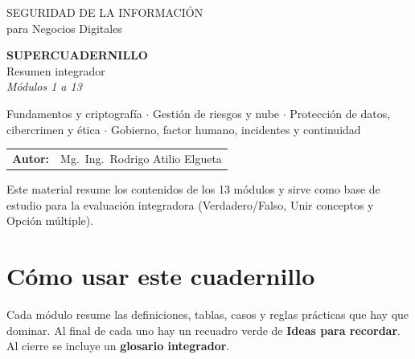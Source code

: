 \documentclass[12pt,a4paper]{article}
\begin{document}
\begin{titlepage}
\centering
\vspace*{1.5cm}
\begin{cajaTitulo}[width=\textwidth, halign=center]
  SEGURIDAD DE LA INFORMACI\'ON\\[4pt]
  {\large para Negocios Digitales}
\end{cajaTitulo}

\vspace{1.8cm}
{\Huge\bfseries\color{azulPrincipal} SUPERCUADERNILLO}\\[10pt]
{\LARGE\color{dorado} Resumen integrador}\\[12pt]
{\Large\itshape M\'odulos 1 a 13}\\[1.5cm]

\begin{minipage}{0.85\textwidth}\centering\large
Fundamentos y criptograf\'ia $\cdot$ Gesti\'on de riesgos y nube $\cdot$
Protecci\'on de datos, cibercrimen y \'etica $\cdot$
Gobierno, factor humano, incidentes y continuidad
\end{minipage}

\vfill
\begin{tabular}{rl}
\textbf{Autor:} & Mg.\ Ing.\ Rodrigo Atilio Elgueta \\
\end{tabular}

\vspace{1cm}
\begin{tcolorbox}[colback=grisClaro, colframe=azulPrincipal, arc=3mm, width=0.9\textwidth]
\centering\small
Este material resume los contenidos de los 13 m\'odulos y sirve como base de
estudio para la evaluaci\'on integradora (Verdadero/Falso, Unir conceptos y
Opci\'on m\'ultiple).
\end{tcolorbox}
\end{titlepage}

\tableofcontents
\newpage

\section*{C\'omo usar este cuadernillo}

Cada m\'odulo resume las definiciones, tablas, casos y reglas pr\'acticas que
hay que dominar. Al final de cada uno hay un recuadro verde de
\textbf{Ideas para recordar}. Al cierre se incluye un \textbf{glosario integrador}.
\end{document}
